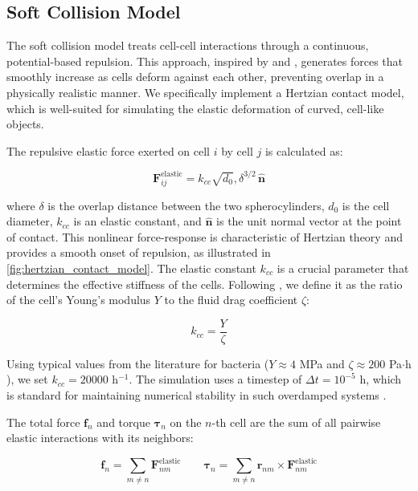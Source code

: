 \documentclass[conference]{IEEEtran}
\begin{document}
\newpage

\subsection{Soft Collision Model}


The soft collision model treats cell-cell interactions through a continuous, potential-based repulsion. This approach, inspired by \cite{Warren2019} and \cite{You2018}, generates forces that smoothly increase as cells deform against each other, preventing overlap in a physically realistic manner. We specifically implement a Hertzian contact model, which is well-suited for simulating the elastic deformation of curved, cell-like objects.

The repulsive elastic force exerted on cell $i$ by cell $j$ is calculated as:

\begin{equation} \label{eq:hertzian_contact_model}
    \mathbf{F}^{\text{elastic}}_{ij} = k_{cc} \sqrt{d_0} , \delta^{3/2} \, \hat{\mathbf{n}}
\end{equation}


where $\delta$ is the overlap distance between the two spherocylinders, $d_0$ is the cell diameter, $k_{cc}$ is an elastic constant, and $\hat{\mathbf{n}}$ is the unit normal vector at the point of contact. This nonlinear force-response is characteristic of Hertzian theory and provides a smooth onset of repulsion, as illustrated in \autoref{fig:hertzian_contact_model}. The elastic constant $k_{cc}$ is a crucial parameter that determines the effective stiffness of the cells. Following \cite{You2018}, we define it as the ratio of the cell's Young's modulus $Y$ to the fluid drag coefficient $\zeta$:


$$
    k_{cc} = \frac{Y}{\zeta}
$$

Using typical values from the literature for bacteria ($Y \approx 4$ MPa \cite{You2018, Blanchard2015} and $\zeta \approx 200$ Pa$\cdot$h \cite{You2018}), we set $k_{cc} = 20000$ h$^{-1}$. The simulation uses a timestep of $\Delta t = 10^{-5}$ h, which is standard for maintaining numerical stability in such overdamped systems \cite{Khan_2024, You2018, Blanchard2015}.

The total force $\mathbf{f}_n$ and torque $\boldsymbol{\tau}_n$ on the $n$-th cell are the sum of all pairwise elastic interactions with its neighbors:

\begin{equation}
    \mathbf{f}_n         = \sum_{m \neq n} \mathbf{F}^{\text{elastic}}_{nm} \qquad
    \boldsymbol{\tau}_n  = \sum_{m \neq n} \mathbf{r}_{nm} \times \mathbf{F}^{\text{elastic}}_{nm}
\end{equation}
\end{document}
